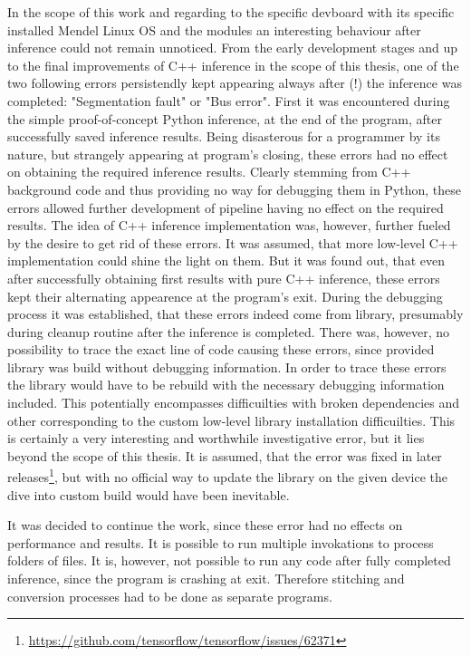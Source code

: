 {In the scope of this work and regarding to the specific \gls{devboard} with its specific installed Mendel Linux OS and the modules an interesting
behaviour after inference could not remain unnoticed.
From the early development stages and up to the final improvements of C++ inference in the scope of this thesis, one of the two following errors persistendly
kept appearing always after (!) the inference was completed: "Segmentation fault" or "Bus error". First it was encountered during the simple proof-of-concept
Python inference, at the end of the program, after successfully saved inference results. Being disasterous for a programmer by its nature,
but strangely appearing at program's closing, these errors had no effect on obtaining the required inference results. Clearly stemming from C++ background code
and thus providing no way for debugging them in Python, these errors allowed further development of pipeline having no effect on the required results.
The idea of C++ inference implementation was, however, further fueled by the desire to get rid of these errors. It was assumed,
that more low-level C++ implementation could shine the light on them. But it was found out, that even after successfully obtaining first results with pure C++ inference,
these errors kept their alternating appearence at the  program's exit. During the debugging process it was established,
that these errors indeed come from  library, presumably during cleanup routine after the inference is completed. There was, however,
no possibility to trace the exact line of code causing these errors, since provided  library was build without debugging information.
In order to trace these errors the library would have to be rebuild with the necessary debugging information included. This potentially encompasses difficuilties
with broken dependencies and other corresponding to the custom low-level library installation difficuilties.
This is certainly a very interesting and worthwhile investigative error, but it lies beyond the scope of this thesis.
It is assumed, that the error was fixed in later  releases\footnote{\url{https://github.com/tensorflow/tensorflow/issues/62371}},
but with no official way to update the library on the given device the dive into custom build would have been inevitable.

It was decided to continue the work, since these error had no effects on performance and results.
It is possible to run multiple  invokations to process folders of files.
It is, however, not possible to run any code after fully completed inference, since the program is crashing at exit.
Therefore stitching and conversion processes had to be done as separate programs.

}
